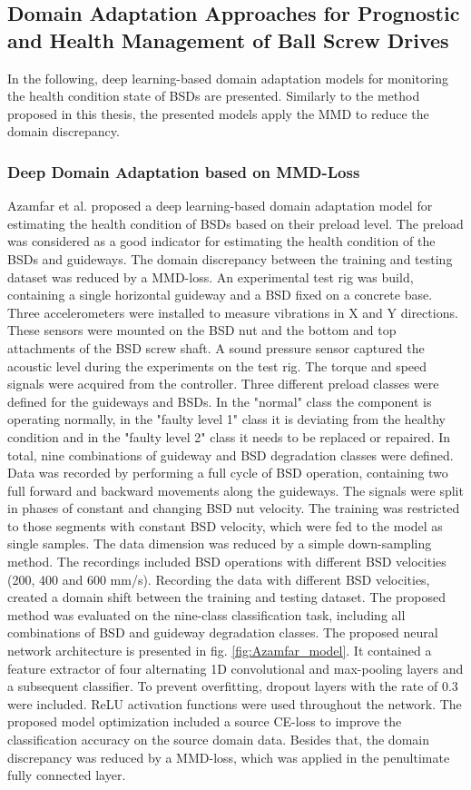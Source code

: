 \subsection{Domain Adaptation Approaches for Prognostic and Health Management of Ball Screw Drives}
In the following, deep learning-based domain adaptation models for monitoring the health condition state of BSDs are presented. Similarly to the method proposed in this thesis, the presented models apply the MMD to reduce the domain discrepancy.


\subsubsection{Deep Domain Adaptation based on MMD-Loss}
Azamfar et al. \cite{AZAMFAR2020103932} proposed a deep learning-based domain adaptation model for estimating the health condition of BSDs based on their preload level. The preload was considered as a good indicator for estimating the health condition of the BSDs and guideways. The domain discrepancy between the training and testing dataset was reduced by a MMD-loss. An experimental test rig was build, containing a single horizontal guideway and a BSD fixed on a concrete base. Three accelerometers were installed to measure vibrations in X and Y directions. These sensors were mounted on the BSD nut and the bottom and top attachments of the BSD screw shaft. A sound pressure sensor captured the acoustic level during the experiments on the test rig. The torque and speed signals were acquired from the controller. Three different preload classes were defined for the guideways and BSDs. In the "normal" class the component is operating normally, in the "faulty level 1" class it is deviating from the healthy condition and in the "faulty level 2" class it needs to be replaced or repaired. In total, nine combinations of guideway and BSD degradation classes were defined. Data was recorded by performing a full cycle of BSD operation, containing two full forward and backward movements along the guideways. The signals were split in phases of constant and changing BSD nut velocity. The training was restricted to those segments with constant BSD velocity, which were fed to the model as single samples. The data dimension was reduced by a simple down-sampling method. The recordings included BSD operations with different BSD velocities (200, 400 and 600 mm/s). Recording the data with different BSD velocities, created a domain shift between the training and testing dataset. The proposed method was evaluated on the nine-class classification task, including all combinations of BSD and guideway degradation classes. The proposed neural network architecture is presented in fig. \ref{fig:Azamfar_model}. It contained a feature extractor of four alternating 1D convolutional and max-pooling layers and a subsequent classifier. To prevent overfitting, dropout layers with the rate of 0.3 were included. ReLU activation functions were used throughout the network. The proposed model optimization included a source CE-loss to improve the classification accuracy on the source domain data. Besides that, the domain discrepancy was reduced by a MMD-loss, which was applied in the penultimate fully connected layer. 

